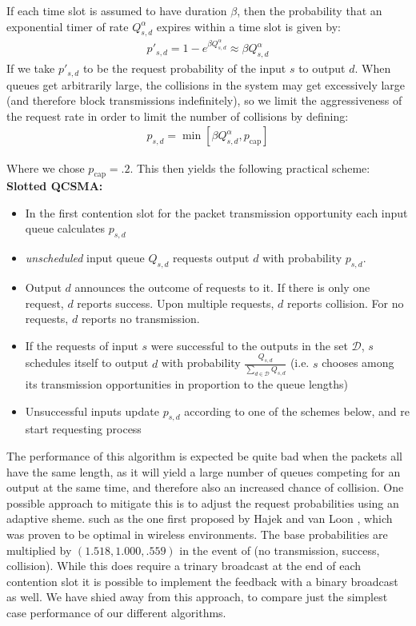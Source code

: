 \documentclass{IEEEtran}%
\begin{document}
If each time slot is assumed to have duration $\beta$, then the probability that an exponential timer of rate $Q_{s,d}^\alpha$ expires within a time slot is given by:
\begin{align}
p'_{s,d} =1-e^{\beta Q_{s,d}^\alpha} \approx \beta Q_{s,d}^\alpha
\end{align}
If we take $p'_{s,d}$ to be the request probability of the input $s$ to output $d$.  When queues get arbitrarily large, the collisions in the system may get excessively large (and therefore block transmissions indefinitely), so we limit the aggressiveness of the request rate in order to limit the number of collisions by defining:
\begin{align}  \label{geo_p}
p_{s,d} =\min \left[ \beta Q_{s,d}^\alpha,p_{\text{cap}}\right]
\end{align}

Where we chose $p_{\text{cap}}=.2$.  This then yields the following practical scheme:\\

{\bf Slotted QCSMA:}
\begin{itemize}
\item In the first contention slot for the packet transmission opportunity each input queue calculates $p_{s,d}$
\item {\it unscheduled} input queue $Q_{s,d}$ requests output $d$ with probability $p_{s,d}$.
\item Output $d$ announces the outcome of requests to it.  If there is only one request, $d$ reports success.  Upon multiple requests, $d$ reports collision. For no requests, $d$ reports no transmission.
\item If the requests of input $s$ were successful to the outputs in the set $\mathcal{D}$, $s$ schedules itself to output $d$ with probability $\frac{Q_{s,d}}{\sum_{d\in \mathcal{D}}Q_{s,d}}$ (i.e. $s$ chooses among its transmission opportunities in proportion to the queue lengths)
\item Unsuccessful inputs update $p_{s,d}$ according to one of the schemes below, and re start requesting process\\
\end{itemize}

The performance of this algorithm is expected be quite bad when the packets all have the same length, as it will yield a large number of queues competing for an output at the same time, and therefore also an increased chance of collision.  One possible approach to mitigate this is to adjust the request probabilities using an adaptive sheme. such as the one first proposed by Hajek and van Loon \cite{Hajek_van_Loon}, which was proven to be optimal in wireless environments.  The base probabilities are multiplied by $(1.518,1.000,.559)$  in the event of (no transmission, success, collision).  While this does require a trinary broadcast at the end of each contention slot it is possible to implement the feedback with a binary broadcast as well.  We have shied away from this approach, to compare just the simplest case performance of our different algorithms.
\end{document}
